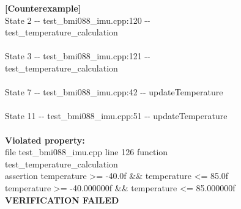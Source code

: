 \begin{figure}[H]
    \centering
    \begin{tcolorbox}[colback=ceFundo, colframe=black!45, boxrule=0.6pt, arc=2pt,
      left=8pt, right=8pt, top=6pt, bottom=6pt, width=0.95\linewidth,
      fontupper=\ttfamily\scriptsize\linespread{1.45}\selectfont]
    \textcolor{ceVermelho}{\textbf{[Counterexample]}}\\
    \textcolor{ceCinza}{State 2 -{}- test\_bmi088\_imu.cpp:120 -{}- test\_temperature\_calculation}\\
    \hspace*{1em}\\
    \textcolor{ceCinza}{State 3 -{}- test\_bmi088\_imu.cpp:121 -{}- test\_temperature\_calculation}\\
    \hspace*{1em}\\
    \textcolor{ceCinza}{State 7 -{}- test\_bmi088\_imu.cpp:42 -{}- updateTemperature}\\
    \hspace*{1em}\\
    \textcolor{ceCinza}{State 11 -{}- test\_bmi088\_imu.cpp:51 -{}- updateTemperature}\\
    \hspace*{1em}\\
    \textcolor{ceVermelho}{\textbf{Violated property:}}\\
    \textcolor{ceVermelho}{\hspace*{1em}file test\_bmi088\_imu.cpp line 126 function test\_temperature\_calculation}\\
    \textcolor{ceVermelho}{\hspace*{1em}assertion temperature >= -40.0f \&\& temperature <= 85.0f}\\
    \textcolor{ceVermelho}{\hspace*{1em}temperature >= -40.000000f \&\& temperature <= 85.000000f}\\
    \textcolor{ceVermelho}{\textbf{VERIFICATION FAILED}}\\[-2pt]

\end{tcolorbox}
\end{figure}
